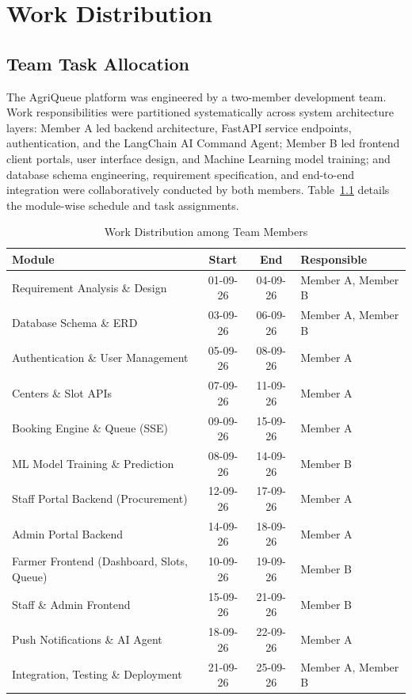 \chapter{Work Distribution}

\section{Team Task Allocation}

The AgriQueue platform was engineered by a two-member development team. Work responsibilities were partitioned systematically across system architecture layers: Member A led backend architecture, FastAPI service endpoints, authentication, and the LangChain AI Command Agent; Member B led frontend client portals, user interface design, and Machine Learning model training; and database schema engineering, requirement specification, and end-to-end integration were collaboratively conducted by both members. Table~\ref{tab:workdist} details the module-wise schedule and task assignments.

\begin{table}[H]
\centering
\small
\caption{Work Distribution among Team Members}
\label{tab:workdist}
\renewcommand{\arraystretch}{1.15}
\begin{tabular}{|>{\raggedright\arraybackslash}p{5.4cm}|c|c|>{\raggedright\arraybackslash}p{4.2cm}|}
\hline
\textbf{Module} & \textbf{Start} & \textbf{End} & \textbf{Responsible} \\ \hline
Requirement Analysis \& Design & 01-09-26 & 04-09-26 & Member A, Member B \\ \hline
Database Schema \& ERD & 03-09-26 & 06-09-26 & Member A, Member B \\ \hline
Authentication \& User Management & 05-09-26 & 08-09-26 & Member A \\ \hline
Centers \& Slot APIs & 07-09-26 & 11-09-26 & Member A \\ \hline
Booking Engine \& Queue (SSE) & 09-09-26 & 15-09-26 & Member A \\ \hline
ML Model Training \& Prediction & 08-09-26 & 14-09-26 & Member B \\ \hline
Staff Portal Backend (Procurement) & 12-09-26 & 17-09-26 & Member A \\ \hline
Admin Portal Backend & 14-09-26 & 18-09-26 & Member A \\ \hline
Farmer Frontend (Dashboard, Slots, Queue) & 10-09-26 & 19-09-26 & Member B \\ \hline
Staff \& Admin Frontend & 15-09-26 & 21-09-26 & Member B \\ \hline
Push Notifications \& AI Agent & 18-09-26 & 22-09-26 & Member A \\ \hline
Integration, Testing \& Deployment & 21-09-26 & 25-09-26 & Member A, Member B \\ \hline
\end{tabular}
\end{table}

